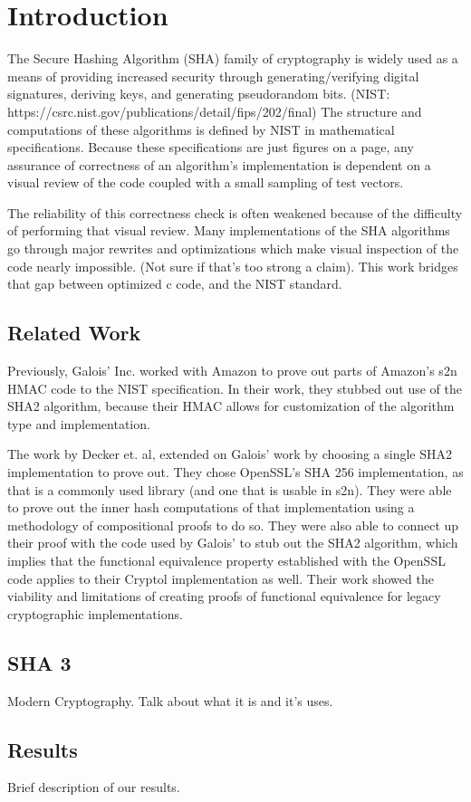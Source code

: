 \section{Introduction}\label{sec:introduction}
  The Secure Hashing Algorithm (SHA) family of cryptography is widely used as a means of providing increased security through generating/verifying digital signatures, deriving keys, and generating pseudorandom bits. (NIST: https://csrc.nist.gov/publications/detail/fips/202/final)  
  The structure and computations of these algorithms is defined by NIST in mathematical specifications.  
  Because these specifications are just figures on a page, any assurance of correctness of an algorithm’s implementation is dependent on a visual review of the code coupled with a small sampling of test vectors.
  
  The reliability of this correctness check is often weakened because of the difficulty of performing that visual review.  
  Many implementations of the SHA algorithms go through major rewrites and optimizations which make visual inspection of the code nearly impossible. (Not sure if that’s too strong a claim).
  This work bridges that gap between optimized c code, and the NIST standard.

  \subsection{Related Work}
  Previously, Galois’ Inc. worked with Amazon to prove out parts of Amazon’s s2n HMAC code to the NIST specification.  
In their work, they stubbed out use of the SHA2 algorithm, because their HMAC allows for customization of the algorithm type and implementation.

The work by Decker et. al, extended on Galois' work by choosing a single SHA2 implementation to prove out.  
They chose OpenSSL’s SHA 256 implementation, as that is a commonly used library (and one that is usable in s2n).  
They were able to prove out the inner hash computations of that implementation using a methodology of compositional proofs to do so.  
They were also able to connect up their proof with the code used by Galois’ to stub out the SHA2 algorithm, which implies that the functional equivalence property established with the OpenSSL code applies to their Cryptol implementation as well.  
Their work showed the viability and limitations of creating proofs of functional equivalence for legacy cryptographic implementations.

\subsection{SHA 3}
Modern Cryptography.  Talk about what it is and it's uses.

\subsection{Results}
Brief description of our results.